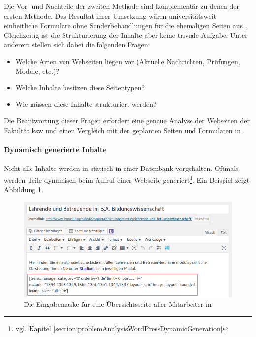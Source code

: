         Die Vor- und Nachteile der zweiten Methode sind komplementär zu denen der ersten Methode.
        Das Resultat ihrer Umsetzung wären universitätsweit einheitliche Formulare
        ohne Sonderbehandlungen für die ehemaligen Seiten aus {\wordpress}.
        Gleichzeitig ist die Strukturierung der Inhalte aber keine triviale Aufgabe.
        Unter anderem stellen sich dabei die folgenden Fragen:

        \begin{itemize}
            \item Welche Arten von Webseiten liegen vor (Aktuelle Nachrichten, Prüfungen, Module, etc.)?
            \item Welche Inhalte besitzen diese Seitentypen?
            \item Wie müssen diese Inhalte strukturiert werden?
        \end{itemize}

        Die Beantwortung dieser Fragen erfordert eine genaue Analyse der Webseiten der Fakultät \gls{ksw}
        und einen Vergleich mit den geplanten Seiten und Formularen in {\imperia}.
        
        \paragraph*{Dynamisch generierte Inhalte}
        Nicht alle Inhalte werden in {\wordpress} statisch in einer Datenbank vorgehalten.
        Oftmals werden Teile dynamisch beim Aufruf einer Webseite
        generiert\footnote{vgl. Kapitel \ref{section:problemAnalysisWordPressDynamicGeneration}}.
        Ein Beispiel zeigt Abbildung \ref{image:introductionFernUniWordpressOverviewForm}.

        \begin{figure}[htb]
            \centering
            \includegraphics[scale=0.6]{../resources/wordpress/teachers-overview.png}
            \caption{Die Eingabemaske für eine Übersichtsseite aller Mitarbeiter in {\wordpress}}
            \label{image:introductionFernUniWordpressOverviewForm}
        \end{figure}

